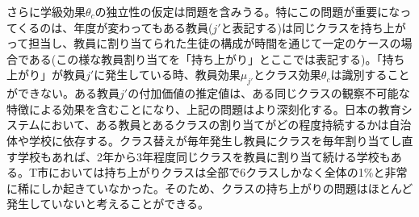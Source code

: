 \documentclass[a4paper,12pt]{article}
\begin{document}
 
さらに学級効果$\theta_c$の独立性の仮定は問題を含みうる。特にこの問題が重要になってくるのは、年度が変わってもある教員($j'$と表記する)は同じクラスを持ち上がって担当し、教員に割り当てられた生徒の構成が時間を通じて一定のケースの場合である(この様な教員割り当てを「持ち上がり」とここでは表記する)。「持ち上がり」が教員$j'$に発生している時、教員効果$\mu_{j'}$とクラス効果$\theta_c$は識別することができない。ある教員$j'$の付加価値の推定値は、ある同じクラスの観察不可能な特徴による効果を含むことになり、上記の問題はより深刻化する。日本の教育システムにおいて、ある教員とあるクラスの割り当てがどの程度持続するかは自治体や学校に依存する。クラス替えが毎年発生し教員にクラスを毎年割り当てし直す学校もあれば、2年から3年程度同じクラスを教員に割り当て続ける学校もある。T市においては持ち上がりクラスは全部で6クラスしかなく全体の1\%と非常に稀にしか起きていなかった。そのため、クラスの持ち上がりの問題はほとんど発生していないと考えることができる。


   　
\end{document}
